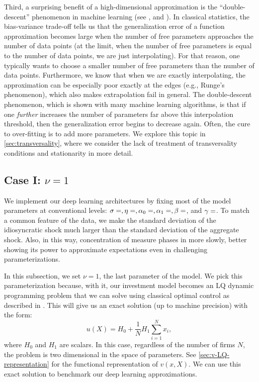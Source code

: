 \documentclass[12pt]{article}
\newcommand{\mapvar}[2][map]{\csname #1#2\endcsname}
\begin{document}
Third, a surprising benefit of a high-dimensional approximation is the ``double-descent'' phenomenon in machine learning (see \citealp{belkin2019reconciling}, and \citealp{ADVANI2020428}). In classical statistics, the bias-variance trade-off tells us that the generalization error of a function approximation becomes large when the number of free parameters approaches the number of data points (at the limit, when the number of free parameters is equal to the number of data points, we are just interpolating). For that reason, one typically wants to choose a smaller number of free parameters than the number of data points. Furthermore, we know that when we are exactly interpolating, the approximation can be especially poor exactly at the edges (e.g., Runge's phenomenon), which also makes extrapolation fail in general. The double-descent phenomenon, which is shown with many machine learning algorithms, is that if one \textit{further} increases the number of parameters far above this interpolation threshold, then the generalization error begins to decrease again. Often, the cure to over-fitting is to add more parameters. We explore this topic in \cref{sec:transversality}, where we consider the lack of treatment of transversality conditions and stationarity in more detail.

 \subsection{Case I: $\nu= 1$}\label{caseI}

We implement our deep learning architectures by fixing most of the model parameters at conventional levels: $\sigma = \mapvar{sigma}, \eta = \mapvar{eta}, \alpha_0 = \mapvar{alpha_0}, \alpha_1 = \mapvar{alpha_1}, \beta = \mapvar{beta}$, and $\gamma = \mapvar{gamma}$. To match a common feature of the data, we make the standard deviation of the idiosyncratic shock much larger than the standard deviation of the aggregate shock. Also, in this way, concentration of measure phases in more slowly, better showing its power to approximate expectations even in challenging parameterizations. 

In this subsection, we set $\nu= 1$, the last parameter of the model. We pick this parameterization because, with it, our investment model becomes an LQ dynamic programming problem that we can solve using classical optimal control as described in \citet{anderson1996mechanics}. This will give us an exact solution (up to machine precision) with the form:
\begin{equation*}
u(X) = H_0 +\frac{1}{N}H_1\sum_{i=1}^N x_i,
\end{equation*}
where $H_0$ and $H_1$ are scalars. In this case, regardless of the number of firms $N$, the problem is two dimensional in the space of parameters. See \cref{sec:v-LQ-representation} for the functional representation of $v(x,X)$. We can use this exact solution to benchmark our deep learning approximations. 
\end{document}
